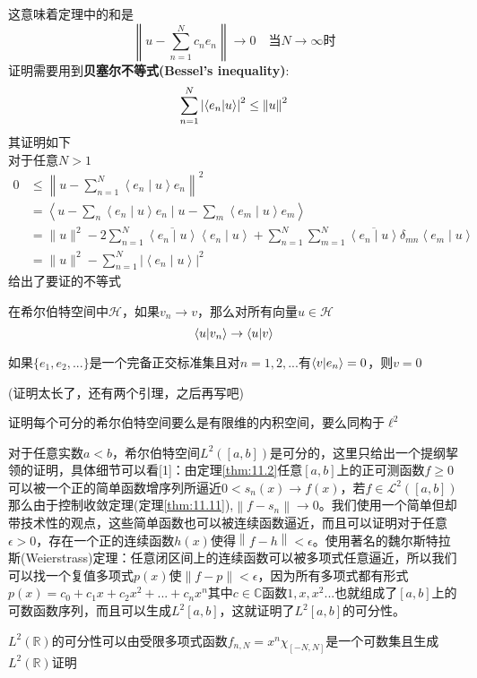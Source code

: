 这意味着定理中的和是
\[\left\lVert u-\sum_{n=1}^{N}c_n e_n\right\rVert\rightarrow0 \quad\text{当}N\rightarrow \infty \text{时}\]
证明需要用到\textbf{贝塞尔不等式(Bessel’s inequality)}:
\begin{equation}
    \sum_{n=1}^{N}\left\lvert \braket{e_n|u} \right\rvert^2 \leq \left\lVert u\right\rVert^2\label{eq:13.5}
\end{equation}
其证明如下\\
对于任意\(N>1\)
$$
\begin{aligned}
0 & \leq\left\|u-\sum_{n=1}^{N}\left\langle e_{n} \mid u\right\rangle e_{n}\right\|^{2} \\
&=\left\langle u-\sum_{n}\left\langle e_{n} \mid u\right\rangle e_{n} \mid u-\sum_{m}\left\langle e_{m} \mid u\right\rangle e_{m}\right\rangle \\
&=\|u\|^{2}-2 \sum_{n=1}^{N} \overline{\left\langle e_{n} \mid u\right\rangle}\left\langle e_{n} \mid u\right\rangle+\sum_{n=1}^{N} \sum_{m=1}^{N} \overline{\left\langle e_{n} \mid u\right\rangle} \delta_{m n}\left\langle e_{m} \mid u\right\rangle \\
&=\|u\|^{2}-\sum_{n=1}^{N}\left|\left\langle e_{n} \mid u\right\rangle\right|^{2}
\end{aligned}
$$
给出了要证的不等式
\begin{lemma}\label{lema:13.3}
    在希尔伯特空间中\(\mathcal{H}\)，如果\(v_n\rightarrow v\)，那么对所有向量\(u\in \mathcal{H}\)    
    \[\braket{u|v_n}\rightarrow\braket{u|v}\]
\end{lemma}
\begin{lemma}\label{lema:13.4}
    如果\(\{e_1,e_2,...\}\)是一个完备正交标准集且对\(n=1,2,...\)有\(\braket{v|e_n}=0\)，则\(v=0\)
\end{lemma}
(证明太长了，还有两个引理，之后再写吧)
\begin{exercise}
    证明每个可分的希尔伯特空间要么是有限维的内积空间，要么同构于\(\ell^2\)
\end{exercise}
\begin{eg}\label{eg:13.5}
    对于任意实数\(a<b\)，希尔伯特空间\(L^2([a,b])\)是可分的，这里只给出一个提纲挈领的证明，具体细节可以看[1]：由定理\ref{thm:11.2}任意\([a,b]\)上的正可测函数\(f\geq 0\)可以被一个正的简单函数增序列所逼近\(0<s_n(x)\rightarrow f(x)\)，若\(f\in \mathcal{L}^2([a,b])\)那么由于控制收敛定理(定理\ref{thm:11.11}),\(\left\lVert f-s_n\right\rVert \rightarrow 0\)。我们使用一个简单但却带技术性的观点，这些简单函数也可以被连续函数逼近，而且可以证明对于任意\(\epsilon>0\)，存在一个正的连续函数\(h(x)\)使得\(\left\lVert f-h\right\rVert <\epsilon\)。使用著名的魏尔斯特拉斯(Weierstrass)定理：任意闭区间上的连续函数可以被多项式任意逼近，所以我们可以找一个复值多项式\(p(x)\)使\(\left\lVert f-p\right\rVert <\epsilon\)，因为所有多项式都有形式
    \(p(x)=c_0+c_1 x+c_2 x^2+...+c_n x^n\)其中\(c\in \mathbb{C}\)函数\(1,x,x^2...\)也就组成了\([a,b]\)上的可数函数序列，而且可以生成\(L^2[a,b]\)，这就证明了\(L^2[a,b]\)的可分性。

    \(L^2(\mathbb{R})\)的可分性可以由受限多项式函数\(f_{n,N}=x^n \chi_{[-N,N]}\)是一个可数集且生成\(L^2(\mathbb{R})\)证明
\end{eg}
